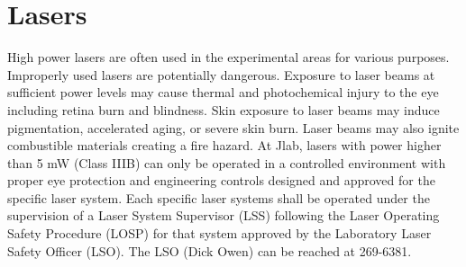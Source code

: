 {{\section{Lasers}

	High power lasers are often used in the experimental areas for various purposes. Improperly 
used lasers are potentially dangerous. Exposure to laser beams at sufficient power levels 
may cause thermal and photochemical injury to the eye including retina burn and blindness. 
Skin exposure to laser beams may induce pigmentation, accelerated aging, or severe skin burn. 
Laser beams may also ignite combustible materials creating a fire hazard. At Jlab, lasers with power 
higher than 5 mW (Class IIIB) can only be operated in a controlled environment with proper eye protection 
and engineering controls designed and approved for the specific laser system. Each specific laser systems 
shall be operated under the supervision of a Laser System Supervisor (LSS) following the Laser 
Operating Safety Procedure (LOSP) for that system approved by the Laboratory Laser Safety Officer (LSO). 
The LSO (Dick Owen) can be reached at 269-6381.

}}
